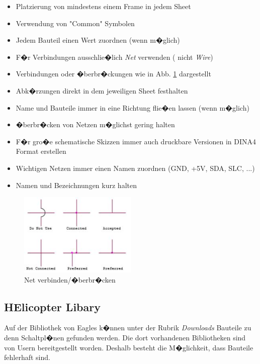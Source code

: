 \begin{itemize}
	\item Platzierung von mindestens einem Frame in jedem Sheet
	\item Verwendung von "Common" Symbolen
	\item Jedem Bauteil einen Wert zuordnen (wenn m�glich)
	\item F�r Verbindungen ausschlie�lich \textit{Net} verwenden ( nicht \textit{Wire})
	\item Verbindungen oder �berbr�ckungen wie in Abb. \ref{CrossingConnection} dargestellt
	\item Abk�rzungen direkt in dem jeweiligen Sheet festhalten
	\item Name und Bauteile immer in eine Richtung flie�en lassen (wenn m�glich)
	\item �berbr�cken von Netzen m�glichst gering halten
	\item F�r gro�e schematische Skizzen immer auch druckbare Versionen in DINA4 Format erstellen
	\item Wichtigen Netzen immer einen Namen zuordnen (GND, +5V, SDA, SLC, ...)
	\item Namen und Bezeichnungen kurz halten
\end{itemize}

\begin{figure}[H]
	\centering
	\includegraphics[width=0.5\textwidth]{fig_motor/Schematic/CrossingConnection.jpg}
	\caption[Net verbinden/�berbr�cken]{Net verbinden/�berbr�cken\protect\footnotemark}
	\label{CrossingConnection}
\end{figure}


\newpage
\subsection{HElicopter Libary}
Auf der Bibliothek von Eagles k�nnen unter der Rubrik \emph{Downloads} Bauteile zu denn Schaltpl�nen gefunden werden. Die dort vorhandenen Bibliotheken sind von Usern bereitgestellt worden. Deshalb besteht die M�glichkeit, dass Bauteile fehlerhaft sind.

